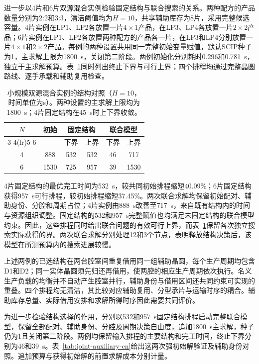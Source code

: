 \documentclass[final,5p,times,twocolumn]{elsarticle}
\begin{document}
进一步以4片和6片双源混合实例检验固定结构与联合搜索的关系。两种配方的产品数量分别为2:2和3:3，清洁阈值均为$H=10$，共享辅助库存为8片，采用完整候选容量。4片实例在LP1、LP2各放置一片$4\times1$产品，在LP3、LP4各放置一片$2\times2$产品；6片实例在LP1、LP2各放置两种配方的产品各一片，在LP3和LP4分别放置一片$4\times1$和$2\times2$产品。每例的两种设置共用同一完整初始变量赋值，默认SCIP种子为1，主求解上限为1800~s，关闭第二阶段。两例初始化分别耗时0.296和0.781~s，独立于主求解预算。表~\ref{tab:joint-small-cn}同时列出终止下界与可行上界；四个排程均通过完整晶圆路线、逐手承载和辅助复用检查。

\begin{table}[!t]
\centering\scriptsize\setlength{\tabcolsep}{3pt}
\caption{小规模双源混合实例的结构对照（$H=10$，时间单位为s）。两种设置的主求解上限均为1800~s；4片固定结构在45~s时上下界收敛。}
\label{tab:joint-small-cn}
\begin{tabular}{cccccc}\toprule
\multirow{2}{*}{$N$} & \multirow{2}{*}{初始} & \multicolumn{2}{c}{固定结构} & \multicolumn{2}{c}{联合模型}\\
\cmidrule(lr){3-4}\cmidrule(lr){5-6}
 & & 下界 & 上界 & 下界 & 上界\\\midrule
4 & 888 & 532 & 532 & 46 & 717\\
6 & 1530 & 725 & 957 & 39 & 1530\\
\bottomrule\end{tabular}\end{table}

4片固定结构的最优完工时间为532~s，较共同初始排程缩短40.09\%；6片固定结构获得957~s可行排程，较初始排程缩短37.45\%。两次联合求解均保留初始配对、辅助身份、分腔和周期占位；4片实例由888~s改善至717~s，来自既有结构内的时间与资源组织调整。固定结构的532和957~s完整赋值也均满足未固定结构的联合模型约束。因此，这些排程同时给出联合问题的有效可行上界，而表~\ref{tab:joint-small-cn}保留各次独立搜索实际获得的界。两次联合求解分别处理12和3个节点，表明释放结构决策后，该模型在所测预算内的搜索进展较慢。

上述两例的已选结构在两台腔室间重复借用同一组辅助晶圆，每个生产周期均包含D1和D2；同一实体晶圆须先归还再借用，使两腔的相应生产周期依次执行。名义生产负载的均衡并不自动产生腔室并行，辅助身份与借用区间还共同约束可实现的重叠。四个排程均无清洁，其比较对应辅助复用、分型承片与运输时序的耦合。辅助库存总量、实际借用安排和求解所得时序因此需要共同评价。

为进一步检验结构选择的作用，分别以532和957~s固定结构排程启动完整联合模型，保留全部配对、辅助身份、分腔及周期决策自由度，追加1800~s主求解，种子仍为1且关闭第二阶段。两例均保留输入排程的主要结构和完工时间，终止下界分别为46和39~s。表~\ref{tab:joint-auxiliary-cn}给出这两次强初始解验证及辅助身份对照。追加预算与获得初始解的前置求解成本分别计量。
\end{document}

